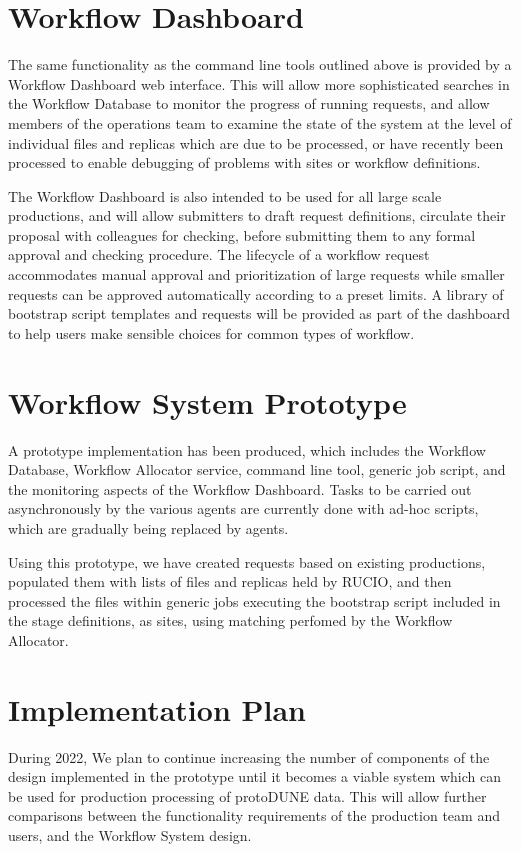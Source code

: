 \documentclass[../main-v1.tex]{subfiles}
\begin{document}
\section{Workflow Dashboard}
\label{sec:flow:dashboard}

The same functionality as the command line tools outlined above is provided by a Workflow Dashboard web interface. This will allow more sophisticated searches in the Workflow Database to monitor the progress of running requests, and allow members of the operations team to examine the state of the system at the level of individual files and replicas which are due to be processed, or have recently been processed to enable debugging of problems with sites or workflow definitions.

The Workflow Dashboard is also intended to be used for all large scale productions, and will allow submitters to draft request definitions, circulate their proposal with colleagues for checking, before submitting them to any formal approval and checking procedure. The lifecycle of a workflow request accommodates manual approval and prioritization of large requests while smaller requests can be approved automatically according to a preset limits. A library of bootstrap script templates and requests will be provided as part of the dashboard to help users make sensible choices for common types of workflow.

\section{Workflow System Prototype}
\label{sec:flow:prototype}

A prototype implementation has been produced, which includes the Workflow Database, Workflow Allocator service, command line tool, generic job script, and the monitoring aspects of the Workflow Dashboard. Tasks to be carried out asynchronously by the various agents are currently done with ad-hoc scripts, which are gradually being replaced by agents.

Using this prototype, we have created requests based on existing productions, populated them with lists of files and replicas held by RUCIO, and then processed the files within generic jobs executing the bootstrap script included in the stage definitions, as sites, using matching perfomed by the Workflow Allocator.

\section{Implementation Plan }
\label{sec:flow:implementation}

During 2022, We plan to continue increasing the number of components of the design implemented in the prototype until it becomes a viable system which can be used for production processing of protoDUNE data. This will allow further comparisons between the functionality requirements of the production team and users, and the Workflow System design.

\end{document}
